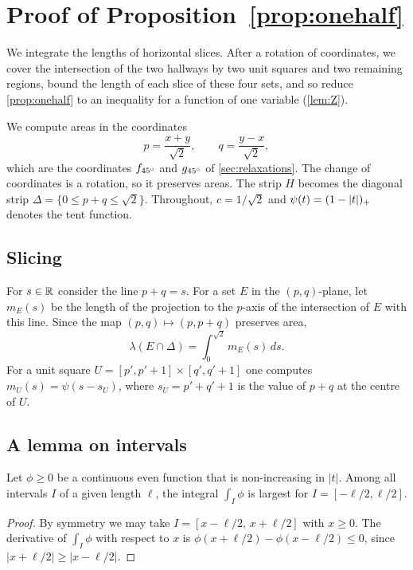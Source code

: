 \section{Proof of \texorpdfstring{Proposition~\ref*{prop:onehalf}}{Proposition 3.7}}\label{app:onehalf}

We integrate the lengths of horizontal slices. After a rotation of coordinates, we cover the intersection of the two hallways by two unit squares and two remaining regions, bound the length of each slice of these four sets, and so reduce \cref{prop:onehalf} to an inequality for a function of one variable (\cref{lem:Z}).

We compute areas in the coordinates
\[
p=\frac{x+y}{\sqrt2}, \qquad q=\frac{y-x}{\sqrt2},
\]
which are the coordinates $f_{45^{\circ}}$ and $g_{45^{\circ}}$ of \cref{sec:relaxations}. The change of coordinates is a rotation, so it preserves areas. The strip $H$ becomes the diagonal strip $\Delta=\{0\le p+q\le\sqrt2\}$. Throughout, $c=1/\sqrt2$ and $\psi(t)=(1-|t|)_{+}$ denotes the tent function.

\subsection*{Slicing}
For $s\in\mathbb{R}$ consider the line $p+q=s$. For a set $E$ in the $(p,q)$-plane, let $m_E(s)$ be the length of the projection to the $p$-axis of the intersection of $E$ with this line. Since the map $(p,q)\mapsto(p,p+q)$ preserves area,
\begin{equation}\label{eq:slicing}
\lambda(E\cap\Delta)=\int_0^{\sqrt2}m_E(s)\,ds .
\end{equation}
For a unit square $U=[p',p'+1]\times[q',q'+1]$ one computes $m_U(s)=\psi(s-s_U)$, where $s_U=p'+q'+1$ is the value of $p+q$ at the centre of $U$.

\subsection*{A lemma on intervals}
\begin{lem}\label{lem:window}
Let $\phi\ge0$ be a continuous even function that is non-increasing in $|t|$. Among all intervals $I$ of a given length $\ell$, the integral $\int_I\phi$ is largest for $I=[-\ell/2,\ell/2]$.
\end{lem}

\begin{proof}
By symmetry we may take $I=[x-\ell/2,\,x+\ell/2]$ with $x\ge0$. The derivative of $\int_I\phi$ with respect to $x$ is $\phi(x+\ell/2)-\phi(x-\ell/2)\le0$, since $|x+\ell/2|\ge|x-\ell/2|$.
\end{proof}

